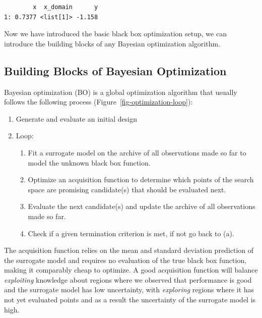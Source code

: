 \begin{verbatim}
        x  x_domain      y
1: 0.7377 <list[1]> -1.158
\end{verbatim}

Now we have introduced the basic black box optimization setup, we can
introduce the building blocks of any Bayesian optimization algorithm.

\hypertarget{sec-bayesian-optimization-blocks}{%
\subsection{Building Blocks of Bayesian
Optimization}\label{sec-bayesian-optimization-blocks}}

Bayesian optimization (BO) is a global optimization algorithm that
usually follows the following process
(Figure~\ref{fig-optimization-loop}):

\begin{enumerate}
\def\labelenumi{\arabic{enumi}.}
\tightlist
\item
  Generate and evaluate an initial design
\item
  Loop:

  \begin{enumerate}
  \def\labelenumii{\alph{enumii}.}
  \tightlist
  \item
    Fit a surrogate model on the archive of all
    observations made so far to model the unknown black box function.
  \item
    Optimize an acquisition function to
    determine which points of the search space are promising
    candidate(s) that should be evaluated next.
  \item
    Evaluate the next candidate(s) and update the archive of all
    observations made so far.
  \item
    Check if a given termination criterion is met, if not go back to
    (a).
  \end{enumerate}
\end{enumerate}

The acquisition function relies on the mean and standard deviation
prediction of the surrogate model and requires no evaluation of the true
black box function, making it comparably cheap to optimize. A good
acquisition function will balance \emph{exploiting} knowledge about
regions where we observed that performance is good and the surrogate
model has low uncertainty, with \emph{exploring} regions where it has
not yet evaluated points and as a result the uncertainty of the
surrogate model is high.

